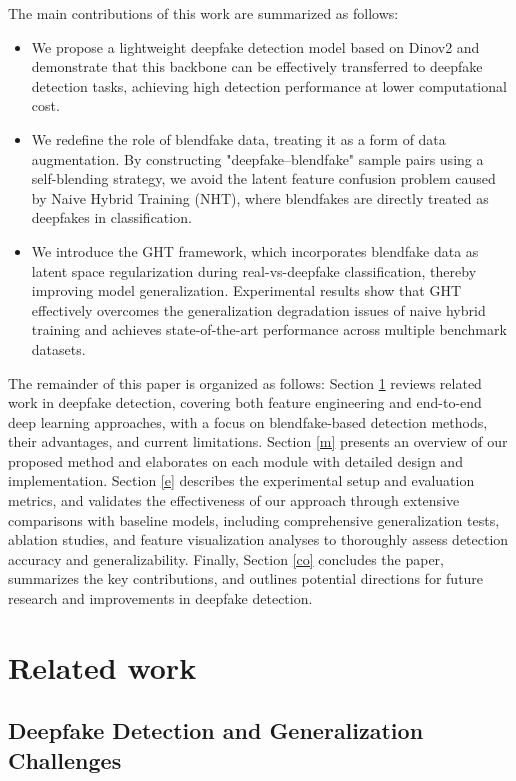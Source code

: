 \documentclass[final,5p,times]{elsarticle}
\begin{document}
The main contributions of this work are summarized as follows:
\begin{itemize}
    \item We propose a lightweight deepfake detection model based on Dinov2 and demonstrate that this backbone can be effectively transferred to deepfake detection tasks, achieving high detection performance at lower computational cost.
    \item We redefine the role of blendfake data, treating it as a form of data augmentation. By constructing "deepfake–blendfake" sample pairs using a self-blending strategy, we avoid the latent feature confusion problem caused by Naive Hybrid Training (NHT), where blendfakes are directly treated as deepfakes in classification.
    \item We introduce the GHT framework, which incorporates blendfake data as latent space regularization during real-vs-deepfake classification, thereby improving model generalization. Experimental results show that GHT effectively overcomes the generalization degradation issues of naive hybrid training and achieves state-of-the-art performance across multiple benchmark datasets.
\end{itemize}

The remainder of this paper is organized as follows: Section \ref{rw} reviews related work in deepfake detection, covering both feature engineering and end-to-end deep learning approaches, with a focus on blendfake-based detection methods, their advantages, and current limitations. Section \ref{m} presents an overview of our proposed method and elaborates on each module with detailed design and implementation. Section \ref{e} describes the experimental setup and evaluation metrics, and validates the effectiveness of our approach through extensive comparisons with baseline models, including comprehensive generalization tests, ablation studies, and feature visualization analyses to thoroughly assess detection accuracy and generalizability. Finally, Section \ref{co} concludes the paper, summarizes the key contributions, and outlines potential directions for future research and improvements in deepfake detection.

\section{Related work} \label{rw}

\subsection{Deepfake Detection and Generalization Challenges}
\end{document}
